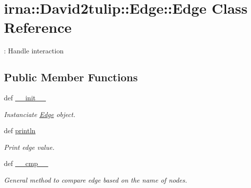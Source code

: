 \hypertarget{classirna_1_1David2tulip_1_1Edge_1_1Edge}{
\section{irna\-:\-:\-David2tulip\-:\-:\-Edge\-:\-:\-Edge \-Class \-Reference}
\label{classirna_1_1David2tulip_1_1Edge_1_1Edge}
}


\-: \-Handle interaction  


\subsection*{\-Public \-Member \-Functions}
\begin{DoxyCompactItemize}
\item 
def \hyperlink{classirna_1_1David2tulip_1_1Edge_1_1Edge_a0bff8edbe3e66dd8d2e05f80bb86d9c2}{\-\_\-\-\_\-init\-\_\-\-\_\-}
\begin{DoxyCompactList}\small\item\em \-Instanciate \hyperlink{classirna_1_1David2tulip_1_1Edge_1_1Edge}{\-Edge} object. \end{DoxyCompactList}\item 
def \hyperlink{classirna_1_1David2tulip_1_1Edge_1_1Edge_a6da3387274a8388325d10c86109c2a9c}{println}
\begin{DoxyCompactList}\small\item\em \-Print edge value. \end{DoxyCompactList}\item 
def \hyperlink{classirna_1_1David2tulip_1_1Edge_1_1Edge_ac3a6afec939bee66445195b47dff3a52}{\-\_\-\-\_\-cmp\-\_\-\-\_\-}
\begin{DoxyCompactList}\small\item\em \-General method to compare edge based on the name of nodes. \end{DoxyCompactList}\end{DoxyCompactItemize}
